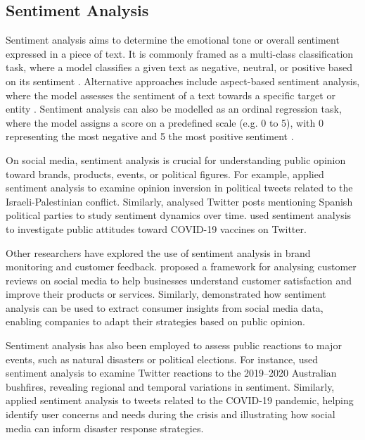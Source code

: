 \subsection{Sentiment Analysis}
Sentiment analysis aims to determine the emotional tone or overall sentiment expressed in a piece of text. It is commonly framed as a multi-class classification task, where a model classifies a given text as negative, neutral, or positive based on its sentiment \cite{mejova2009sentiment}. Alternative approaches include aspect-based sentiment analysis, where the model assesses the sentiment of a text towards a specific target or entity \cite{zhang2022survey}. Sentiment analysis can also be modelled as an ordinal regression task, where the model assigns a score on a predefined scale (e.g. 0 to 5), with 0 representing the most negative and 5 the most positive sentiment \cite{saad2019twitter}.

On social media, sentiment analysis is crucial for understanding public opinion toward brands, products, events, or political figures. For example, \citet{matalon2021using} applied sentiment analysis to examine opinion inversion in political tweets related to the Israeli-Palestinian conflict. Similarly, \citet{rodriguez2021sentiment} analysed Twitter posts mentioning Spanish political parties to study sentiment dynamics over time. \citet{alaparthi2021bert} used sentiment analysis to investigate public attitudes toward COVID-19 vaccines on Twitter.

Other researchers have explored the use of sentiment analysis in brand monitoring and customer feedback. \citet{chowdhury2024sentiment} proposed a framework for analysing customer reviews on social media to help businesses understand customer satisfaction and improve their products or services. Similarly, \citet{chamlertwat2012discovering} demonstrated how sentiment analysis can be used to extract consumer insights from social media data, enabling companies to adapt their strategies based on public opinion.

Sentiment analysis has also been employed to assess public reactions to major events, such as natural disasters or political elections. For instance, \citet{willson2021twitter} used sentiment analysis to examine Twitter reactions to the 2019–2020 Australian bushfires, revealing regional and temporal variations in sentiment. Similarly, \citet{behl2021twitter} applied sentiment analysis to tweets related to the COVID-19 pandemic, helping identify user concerns and needs during the crisis and illustrating how social media can inform disaster response strategies.

